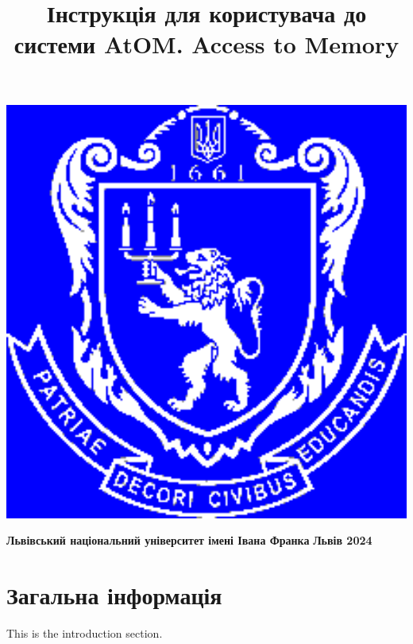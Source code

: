 \documentclass[14pt,a4paper]{article}
\title{\Huge \textbf{Інструкція для користувача  до системи AtOM. Access to Memory} }
\date{}
\begin{document}
\begin{titlepage}
    \pagecolor{blue} 
    \color{white}
    \maketitle
    \thispagestyle{empty}
    
	\begin{center}
	\includegraphics[max width=1.5\textwidth]{Images/logo_bl.png}
	\end{center}    
    
    \vspace*{8cm}
    \center \textbf{Львівський національний університет імені Івана Франка}
    \center \textbf{Львів 2024}

\end{titlepage}

\pagecolor{white}
\color{black}

\newpage

\tableofcontents
\newpage
\listoffigures
\newpage
\listoftables
\newpage
{}

\section{Загальна інформація}
This is the introduction section.
\end{document}
